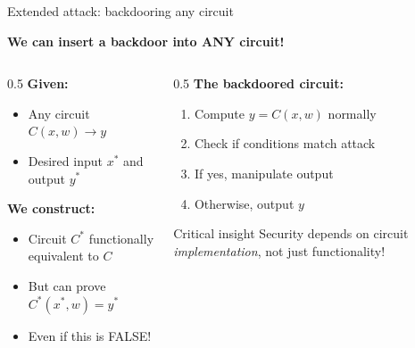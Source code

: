 \ifdefined\PRESENTATION\else\PassOptionsToClass{handout}{beamer}\fi\documentclass[aspectratio=169, lualatex]{beamer}
\begin{document}
\begin{frame}{Extended attack: backdooring any circuit}
	\begin{center}
		\textbf{We can insert a backdoor into ANY circuit!}
	\end{center}
	\begin{columns}[c]
		\begin{column}{0.5\textwidth}
			\textbf{Given:}
			\begin{itemize}
				\item Any circuit $C(x,w) \rightarrow y$
				\item Desired input $x^*$ and output $y^*$
			\end{itemize}
			\textbf{We construct:}
			\begin{itemize}
				\item Circuit $C^*$ functionally equivalent to $C$
				\item But can prove $C^*(x^*, w) = y^*$
				\item Even if this is FALSE!
			\end{itemize}
		\end{column}
		\begin{column}{0.5\textwidth}
			\textbf{The backdoored circuit:}
			\begin{enumerate}
				\item Compute $y = C(x,w)$ normally
				\item Check if conditions match attack
				\item If yes, manipulate output
				\item Otherwise, output $y$
			\end{enumerate}
			\begin{alertblock}{Critical insight}
				Security depends on circuit \textit{implementation}, not just functionality!
			\end{alertblock}
		\end{column}
	\end{columns}
\end{frame}
\end{document}
